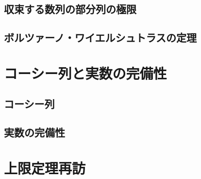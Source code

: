\documentclass[../math-imaging]{subfiles}
\begin{document}

\subsection{収束する数列の部分列の極限}


\subsection{ボルツァーノ・ワイエルシュトラスの定理}


\section{コーシー列と実数の完備性}

\subsection{コーシー列}


\subsection{実数の完備性}


\section{上限定理再訪}

\end{document}
